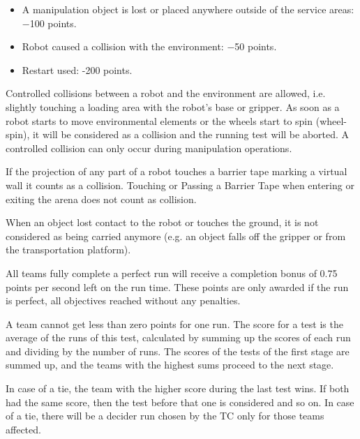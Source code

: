 \begin{itemize}
	\item A manipulation object is lost or placed anywhere outside of the service areas: −100 points.
	\item Robot caused a collision with the environment: −50 points.
	\item Restart used: -200 points.
\end{itemize}

Controlled collisions between a robot and the environment are allowed, i.e. slightly touching a loading area with the robot’s base or gripper. As soon as a robot starts to move environmental elements or the wheels start to spin (wheel-spin), it will be considered as a collision and the running test will be aborted. A controlled collision can only occur during manipulation operations.
\par
If the projection of any part of a robot touches a barrier tape marking a virtual wall it counts as a collision. Touching or Passing a Barrier Tape when entering or exiting the arena does not count as collision.
\par
When an object lost contact to the robot or touches the ground, it is not considered as being carried anymore (e.g. an object falls off the gripper or from the transportation platform).
\par
All teams fully complete a perfect run will receive a completion bonus of 0.75 points per second left on the run time. These points are only awarded if the run is perfect, all objectives reached without any penalties.
\par
A team cannot get less than zero points for one run. The score for a test is the average of the runs of this test, calculated by summing up the scores of each run and dividing by the number of runs. The scores of the tests of the first stage are summed up, and the teams with the highest sums proceed to the next stage.
\par
In case of a tie, the team with the higher score during the last test wins. If both had the same score, then the test before that one is considered and so on. In case of a tie, there will be a decider run chosen by the TC only for those teams affected.
\par
\par

